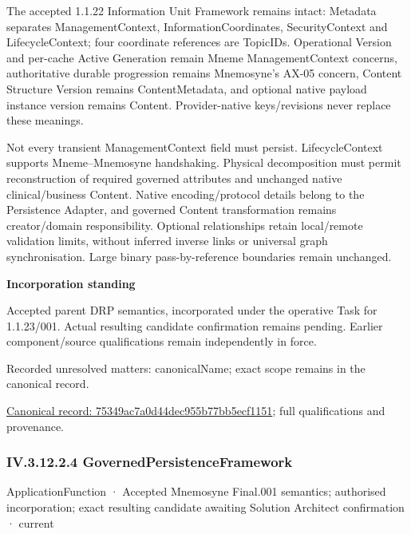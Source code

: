 The accepted 1.1.22 Information Unit Framework remains intact: Metadata separates ManagementContext, InformationCoordinates, SecurityContext and LifecycleContext; four coordinate references are TopicIDs. Operational Version and per-cache Active Generation remain Mneme ManagementContext concerns, authoritative durable progression remains Mnemosyne's AX-05 concern, Content Structure Version remains ContentMetadata, and optional native payload instance version remains Content. Provider-native keys/revisions never replace these meanings.



Not every transient ManagementContext field must persist. LifecycleContext supports Mneme–Mnemosyne handshaking. Physical decomposition must permit reconstruction of required governed attributes and unchanged native clinical/business Content. Native encoding/protocol details belong to the Persistence Adapter, and governed Content transformation remains creator/domain responsibility. Optional relationships retain local/remote validation limits, without inferred inverse links or universal graph synchronisation. Large binary pass-by-reference boundaries remain unchanged.



\par\medskip\textbf{Incorporation standing}\par


Accepted parent DRP semantics, incorporated under the operative Task for 1.1.23/001. Actual resulting candidate confirmation remains pending. Earlier component/source qualifications remain independently in force.


{\small Recorded unresolved matters: canonicalName; exact scope remains in the canonical record.}\par
{\footnotesize \href{../../../../../../../continuum/application/application-function/75349ac7a0d44dec955b77bb5ecf1151.md}{Canonical record: 75349ac7a0d44dec955b77bb5ecf1151}; full qualifications and provenance.}\par
\subsubsection*{IV.3.12.2.4 GovernedPersistenceFramework}
\label{navigation:IV.3.12.2.4}

\label{element:812fa47cef1442aeb34ec34f263616be}
{\small ApplicationFunction · Accepted Mnemosyne Final.001 semantics; authorised incorporation; exact resulting candidate awaiting Solution Architect confirmation · current}\par


